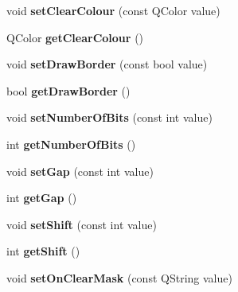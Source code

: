 \begin{DoxyCompactItemize}
\item 
\hypertarget{classQBitStatus_a72cce7c86f60acb165a5522ccb04ecfc}{
void {\bfseries setClearColour} (const QColor value)}
\label{classQBitStatus_a72cce7c86f60acb165a5522ccb04ecfc}

\item 
\hypertarget{classQBitStatus_a61b64433ee16817a927015db049c4a62}{
QColor {\bfseries getClearColour} ()}
\label{classQBitStatus_a61b64433ee16817a927015db049c4a62}

\item 
\hypertarget{classQBitStatus_adc42934ac754dad65a28b978ecd73f97}{
void {\bfseries setDrawBorder} (const bool value)}
\label{classQBitStatus_adc42934ac754dad65a28b978ecd73f97}

\item 
\hypertarget{classQBitStatus_a6f639757164c49af2f103496701c83e8}{
bool {\bfseries getDrawBorder} ()}
\label{classQBitStatus_a6f639757164c49af2f103496701c83e8}

\item 
\hypertarget{classQBitStatus_ac8b8ede2aee2c34ea96c89588a0d0b97}{
void {\bfseries setNumberOfBits} (const int value)}
\label{classQBitStatus_ac8b8ede2aee2c34ea96c89588a0d0b97}

\item 
\hypertarget{classQBitStatus_ae60c040d33492dae00f79caec4010cf1}{
int {\bfseries getNumberOfBits} ()}
\label{classQBitStatus_ae60c040d33492dae00f79caec4010cf1}

\item 
\hypertarget{classQBitStatus_aa6530d831635d5cce388183bad18c0be}{
void {\bfseries setGap} (const int value)}
\label{classQBitStatus_aa6530d831635d5cce388183bad18c0be}

\item 
\hypertarget{classQBitStatus_aaa4e72b9f8b75cf7b3342b0d7ad8862e}{
int {\bfseries getGap} ()}
\label{classQBitStatus_aaa4e72b9f8b75cf7b3342b0d7ad8862e}

\item 
\hypertarget{classQBitStatus_adb32654d33cd7bc1e3b86463f0348995}{
void {\bfseries setShift} (const int value)}
\label{classQBitStatus_adb32654d33cd7bc1e3b86463f0348995}

\item 
\hypertarget{classQBitStatus_aa32b9af85c9b0a79d6f3e981ca80180e}{
int {\bfseries getShift} ()}
\label{classQBitStatus_aa32b9af85c9b0a79d6f3e981ca80180e}

\item 
\hypertarget{classQBitStatus_a280223b25d18ad8eb75e02eddb1d7611}{
void {\bfseries setOnClearMask} (const QString value)}
\label{classQBitStatus_a280223b25d18ad8eb75e02eddb1d7611}


\end{DoxyCompactItemize}
